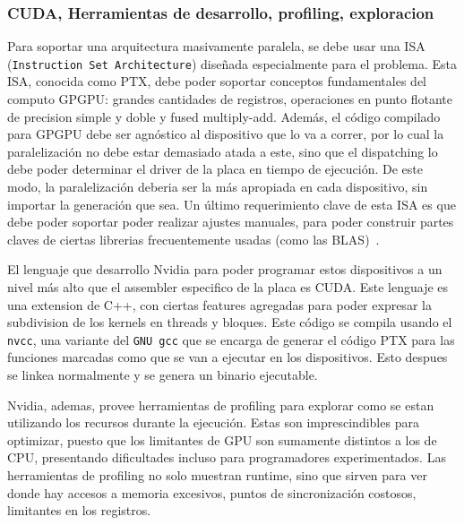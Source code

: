 \subsubsection{CUDA, Herramientas de desarrollo, profiling, exploracion}

Para soportar una arquitectura masivamente paralela, se debe usar una ISA
(\texttt{Instruction Set Architecture}) dise\~nada especialmente para el problema. Esta ISA, conocida como PTX,
debe poder soportar conceptos fundamentales del computo GPGPU: grandes cantidades de registros,
operaciones en punto flotante de precision simple y doble y fused multiply-add. Adem\'as,
el c\'odigo compilado para GPGPU debe ser agn\'ostico al dispositivo que lo va a correr, por
lo cual la paralelizaci\'on no debe estar demasiado atada a este, sino que el dispatching
lo debe poder determinar el driver de la placa en tiempo de ejecuci\'on. De este modo, la paralelizaci\'on
deberia ser la m\'as apropiada en cada dispositivo, sin importar la generaci\'on que sea. Un \'ultimo
requerimiento clave de esta ISA es que debe poder soportar poder realizar ajustes manuales,
para poder construir partes claves de ciertas librerias frecuentemente usadas (como las BLAS)~\cite{NvidiaFermi}.

El lenguaje que desarrollo Nvidia para poder programar estos dispositivos a un nivel m\'as alto
que el assembler especifico de la placa es CUDA. Este lenguaje es una extension de C++, con ciertas
features agregadas para poder expresar la subdivision de los kernels en threads y bloques.
Este c\'odigo se compila usando el \texttt{nvcc}, una variante del \texttt{GNU gcc} que se
encarga de generar el c\'odigo PTX para las funciones marcadas como que se van a ejecutar
en los dispositivos. Esto despues se linkea normalmente y se genera un binario ejecutable.

Nvidia, ademas, provee herramientas de profiling para explorar como se estan utilizando los
recursos durante la ejecuci\'on. Estas son imprescindibles para optimizar, puesto que los limitantes
de GPU son sumamente distintos a los de CPU, presentando dificultades incluso para programadores
experimentados. Las herramientas de profiling no solo muestran runtime, sino que sirven para
ver donde hay accesos a memoria excesivos, puntos de sincronizaci\'on costosos, limitantes
en los registros.


